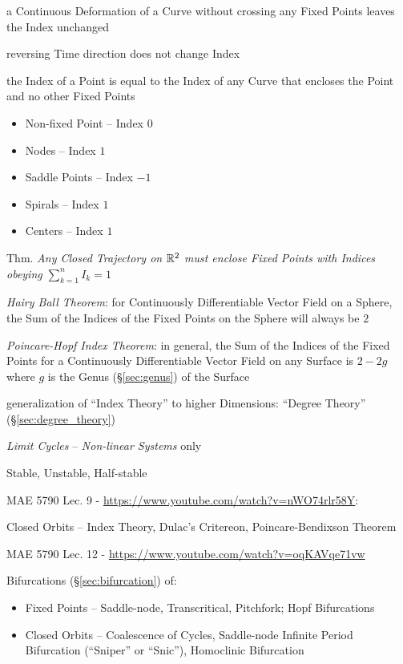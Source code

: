 a Continuous Deformation of a Curve without crossing any Fixed Points leaves
the Index unchanged

reversing Time direction does not change Index

the Index of a Point is equal to the Index of any Curve that encloses the Point
and no other Fixed Points

\begin{itemize}
  \item Non-fixed Point -- Index $0$
  \item Nodes -- Index $1$
  \item Saddle Points -- Index $-1$
  \item Spirals -- Index $1$
  \item Centers -- Index $1$
\end{itemize}

Thm. \emph{Any Closed Trajectory on $\mathbb{R}^2$ must enclose Fixed Points with
  Indices obeying $\sum_{k=1}^n I_k = 1$}

\emph{Hairy Ball Theorem}: for Continuously Differentiable Vector Field
on a Sphere, the Sum of the Indices of the Fixed Points on the Sphere will
always be $2$

\emph{Poincare-Hopf Index Theorem}: in general, the Sum of the Indices of the
Fixed Points for a Continuously Differentiable Vector Field on any Surface is
$2 - 2g$ where $g$ is the Genus (\S\ref{sec:genus}) of the Surface

generalization of ``Index Theory'' to higher Dimensions: ``Degree Theory''
(\S\ref{sec:degree_theory})


\asterism

\emph{Limit Cycles} -- \emph{Non-linear Systems} only

Stable, Unstable, Half-stable


MAE 5790 Lec. 9 - \url{https://www.youtube.com/watch?v=nWO74rlr58Y}:

Closed Orbits -- Index Theory, Dulac's Critereon, Poincare-Bendixson Theorem

MAE 5790 Lec. 12 - \url{https://www.youtube.com/watch?v=oqKAVqe71vw}

Bifurcations (\S\ref{sec:bifurcation}) of:
\begin{itemize}
  \item Fixed Points -- Saddle-node, Transcritical, Pitchfork; Hopf Bifurcations
  \item Closed Orbits -- Coalescence of Cycles,
    Saddle-node Infinite Period Bifurcation (``Sniper'' or ``Snic''),
    Homoclinic Bifurcation
\end{itemize}

